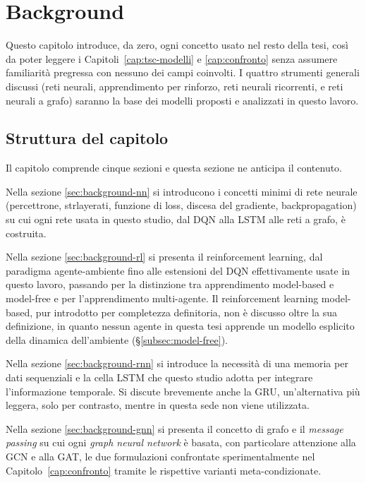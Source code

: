 \chapter{Background}
\label{cap:background}

Questo capitolo introduce, da zero, ogni concetto usato nel resto della
tesi, così da poter leggere i Capitoli~\ref{cap:tsc-modelli} e
\ref{cap:confronto} senza assumere familiarità pregressa con nessuno dei
campi coinvolti. I quattro strumenti generali discussi (reti neurali,
apprendimento per rinforzo, reti neurali ricorrenti, e reti neurali a
grafo) saranno la base dei modelli proposti e analizzati in questo lavoro.

\section{Struttura del capitolo}
\label{sec:background-overview}

Il capitolo comprende cinque sezioni e questa sezione ne anticipa il contenuto.

Nella sezione \ref{sec:background-nn} si introducono i concetti minimi di rete
neurale (percettrone, strlayerati, funzione di loss, discesa del gradiente,
backpropagation) su cui ogni rete usata in questo studio, dal DQN alla
LSTM alle reti a grafo, è costruita.

Nella sezione \ref{sec:background-rl} si presenta il reinforcement learning,
dal paradigma agente-ambiente fino alle estensioni del DQN effettivamente
usate in questo lavoro, passando per la distinzione tra apprendimento
model-based e model-free e per l'apprendimento multi-agente. Il
reinforcement learning model-based, pur introdotto per completezza
definitoria, non è discusso oltre la sua definizione, in quanto nessun agente
in questa tesi apprende un modello esplicito della dinamica
dell'ambiente (§\ref{subsec:model-free}).

Nella sezione \ref{sec:background-rnn} si introduce la necessità di una memoria
per dati sequenziali e la cella LSTM che questo studio adotta per
integrare l'informazione temporale. Si discute brevemente anche la GRU,
un'alternativa più leggera, solo per contrasto, mentre in questa sede non viene utilizzata.

Nella sezione \ref{sec:background-gnn} si presenta il concetto di grafo
e il \emph{message passing} su cui ogni \emph{graph neural network} è
basata, con particolare attenzione alla GCN e alla GAT, le due
formulazioni confrontate sperimentalmente nel Capitolo~\ref{cap:confronto}
tramite le rispettive varianti meta-condizionate.

